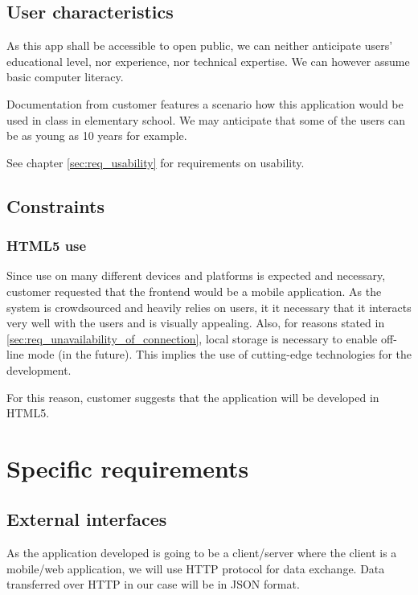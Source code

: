 \documentclass[11pt]{book}
\begin{document}
\subsection{User characteristics} \label{sec:req_user_characteristics}
As this app shall be accessible to open public, we can neither anticipate users' educational level, nor experience, nor technical expertise. We can however assume basic computer literacy.

Documentation from customer features a scenario how this application would be used in class in elementary school. We may anticipate that some of the users can be as young as 10 years for example.

See chapter \ref{sec:req_usability} for requirements on usability.

\subsection{Constraints}

\subsubsection{HTML5 use}
Since use on many different devices and platforms is expected and necessary, customer requested that the frontend would be a mobile application. As the system is crowdsourced and heavily relies on users, it it necessary that it interacts very well with the users and is visually appealing. Also, for reasons stated in \ref{sec:req_unavailability_of_connection}, local storage is necessary to enable off-line mode (in the future). This implies the use of cutting-edge technologies for the development.

For this reason, customer suggests that the application will be developed in HTML5.

\section{Specific requirements}\label{sec:req_specific_requirements}

\subsection{External interfaces}
As the application developed is going to be a client/server where the client is a mobile/web application, we will use HTTP protocol for data exchange. Data transferred over HTTP in our case will be in JSON format.
\end{document}
